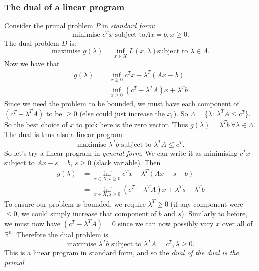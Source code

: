 \documentclass[egregdoesnotlikesansseriftitles,a4paper]{scrartcl}
\begin{document}
\subsubsection{The dual of a linear program}
Consider the primal problem $P$ in \emph{standard form}: 
\[\text{minimise } c^Tx \text{ subject to} Ax=b, x \geq 0.\]
The dual problem $D$ is: 
\[\text{maximise } g (\lambda)=\inf_{x \in X} L (x, \lambda) \text{subject to } \lambda \in \Lambda.\]
Now we have that 
\begin{equation*}
	\begin{split}
		g (\lambda)&=\inf_{x \geq 0} c^Tx - \lambda^T (Ax-b)\\
		&=\inf_{x \geq 0} (c^T - \lambda^TA)x+\lambda^T b
	\end{split}
\end{equation*}
Since we need the problem to be bounded, we must have each component of $(c^T-\lambda^TA)$ to be $\geq 0$ (else could just increase the $x_i$). So $\Lambda=\{\lambda: \ \lambda^TA \leq c^T\}$. So the best choice of $x$ to pick here is the zero vector. Thus $g (\lambda)=\lambda^T b \ \forall \lambda \in \Lambda$.
The dual is thus also a linear program: 
\[\text{maximise } \lambda^Tb \text{ subject to } \lambda^TA \leq c^T.\]
So let's try a linear program in \emph{general form}.
We can write it as minimising $c^Tx$ subject to $Ax-s=b$, $s \geq 0$ (slack variable). Then
\begin{equation*}
	\begin{split}
		g (\lambda)&=\inf_{x \in X,s \geq 0} c^Tx - \lambda^T (Ax-s-b)\\
		&=\inf_{x \in X, s \geq 0} (c^T - \lambda^TA)x+\lambda^T s+\lambda^T b
	\end{split}
\end{equation*}
To ensure our problem is bounded, we require $\lambda^T \geq 0$ (if any component were $\leq 0$, we could simply increase that component of $b$ and $s$). Similarly to before, we must now have $(c^T-\lambda^T A)=0$ since we can now possibly vary $x$ over all of $\mathbb{R}^{n} $. Therefore the dual problem is 
\[\text{maximise } \lambda^Tb \text{ subject to } \lambda^TA= c^T, \lambda \geq 0.\]
This is a linear program in standard form, and so the \emph{dual of the dual is the primal}.
\end{document}
